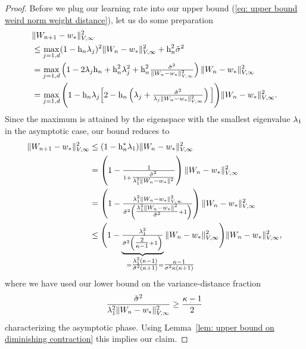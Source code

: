 \begin{proof}
	Before we plug our learning rate into our upper bound (\ref{eq: upper bound
	weird norm weight distance}), let us do some preparation 
	\begin{align}
		\nonumber
		&\|W_{n+1} -w_*\|_{V,\infty}^2\\
		\nonumber
		&\le \max_{j=1,d} (1-\text{h}_n\lambda_j)^2\|W_n -w_*\|_{V,\infty}^2
		+ \text{h}_n^2 \tilde{\sigma}^2\\
		\label{eq: upper bound useful for rate of convergence}
		&= \max_{j=1,d}\left(1- 2\lambda_j\text{h}_n + \text{h}_n^2\lambda_j^2
			+\text{h}_n^2\tfrac{\tilde{\sigma}^2}{\|W_n-w_*\|_{V,\infty}^2}
		\right)\|W_n-w_*\|_{V,\infty}^2\\
		\nonumber
		&= \max_{j=1,d}\Bigg(1- \text{h}_n \lambda_j\Big[2 - \text{h}_n \left(
			\lambda_j + \tfrac{\tilde{\sigma}^2}{\lambda_j\|W_n-w_*\|_{V,\infty}^2}
		\right)\Big] \Bigg)\|W_n-w_*\|_{V,\infty}^2.
	\end{align}
	Since the maximum is attained by the eigenspace with the smallest eigenvalue \(\lambda_1\)
	in the asymptotic case, our bound reduces to
	\begin{align*}
		\|\Weights_{n+1} -\minimum\|_{V,\infty}^2
		&\le (1- \lr_n^* \hesseEV_1)\|\Weights_n-\minimum\|_{V,\infty}^2\\
		&= \left(1- \tfrac{1}{1+ \tfrac{\tilde{\stdBound}^2}{\hesseEV_1^2\|\Weights_n-\minimum\|^2}}\right)
		\|\Weights_n-\minimum\|_{V,\infty}^2\\
		&= \left(1- \tfrac{
			\hesseEV_1^2 \|\Weights_n-\minimum\|_{V,\infty}^2
		}{
			\tilde{\stdBound}^2
			\left(\tfrac{\hesseEV_1^2\|\Weights_n-\minimum\|^2}{\tilde{\stdBound}^2}+1\right)
		}\right)
		\|\Weights_n-\minimum\|_{V,\infty}^2\\
		&\le \Bigg(
		1- \underbrace{\tfrac{
			\hesseEV_1^2
		}{
			\tilde{\stdBound}^2
			\left(\tfrac{2}{\condition -1}+1\right)
		}}_{
			=\tfrac{\hesseEV_1^2(\condition-1)}{\tilde{\stdBound}^2(\condition+1)}
			\mathrlap{=\tfrac{\condition-1}{\stdBound^2\condition(\condition+1)}}
		}
		\|\Weights_n-\minimum\|_{V,\infty}^2
		\Bigg)
		\|\Weights_n-\minimum\|_{V,\infty}^2,
	\end{align*}
	where we have used our lower bound on the variance-distance fraction
	\begin{align*}
		\frac{\tilde{\sigma}^2}{
			\lambda_1^2\|W_n-w_*\|_{V,\infty}^2
		}
		\ge \frac{\kappa-1}{2}
	\end{align*}
	characterizing the asymptotic phase. Using Lemma~\ref{lem: upper bound on diminishing contraction}
	this implies our claim.


\end{proof}
